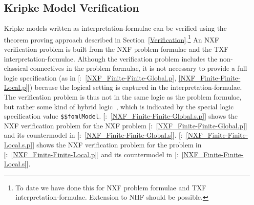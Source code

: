 \documentclass{easychair}
\newcommand{\smalltt}[1]{\small \texttt{#1}}
\newcommand{\example}{{\scriptsize \faFile[regular]}}
\begin{document}
\subsection{Kripke Model Verification}
\label{KripkeVerification}

Kripke models written as interpretation-formulae can be verified using the theorem proving 
approach described in Section~\ref{Verification}.\footnote{%
To date we have done this for NXF problem formulae and TXF interpretation-formulae. 
Extension to NHF should be possible.}
An NXF verification problem is built from the NXF problem formulae and the TXF 
interpretation-formulae.
Although the verification problem includes the non-classical connectives in the problem
formulae, it is not necessary to provide a full logic specification (as in 
[\example{}:~\ref{NXF_Finite-Finite-Global.p}, 
\ref{NXF_Finite-Finite-Local.p}]) because the logical setting is captured in 
the interpretation-formulae.
The verification problem is thus not in the same logic as the problem formulae, but rather
some kind of hybrid logic~\cite{Bra11}, which is indicated by the special logic specification
value \smalltt{\$\$fomlModel}.
[\example{}:~\ref{NXF_Finite-Finite-Global.s.p}] shows the NXF 
verification problem for the NXF problem
[\example{}:~\ref{NXF_Finite-Finite-Global.p}] and its countermodel 
in [\example{}:~\ref{NXF_Finite-Finite-Global.s}].
[\example{}:~\ref{NXF_Finite-Finite-Local.s.p}] shows the NXF 
verification problem for the problem in 
[\example{}:~\ref{NXF_Finite-Finite-Local.p}] and its countermodel in 
[\example{}:~\ref{NXF_Finite-Finite-Local.s}].
\end{document}
